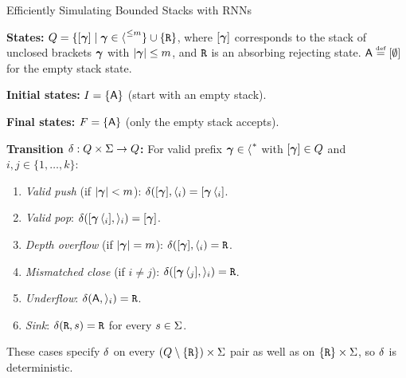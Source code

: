 \begin{question}{Efficiently Simulating Bounded Stacks with RNNs}
\begin{subquestion}
    \textbf{States:} $\states = \{[\stackseq] \mid \stackseq \in \openBr{}^{\le m}\} \cup \{\rejectState\}$, where $[\stackseq]$ corresponds to the stack of unclosed 
    brackets $\stackseq$ with $|\stackseq| \le m$, and $\rejectState$ is an absorbing rejecting state. $\acceptState \defeq [\emptystack]$ for the empty stack state.
    
    \textbf{Initial states:} $\initial = \{\acceptState\}$ (start with an empty stack).
    
    \textbf{Final states:} $\final = \{\acceptState\}$ (only the empty stack accepts).
    
    \textbf{Transition $\trans : \states \times \alphabet \to \states$:} For valid prefix $\stackseq \in \openBr{}^{*}$ with $[\stackseq] \in \states$ and $i, j \in \{1, \dots, k\}$:
    
    \begin{enumerate}
        \item \emph{Valid push} (if $|\stackseq| < m$): $\trans([\stackseq], \openBr{i}) = [\stackseq\, \openBr{i}]$.
        \item \emph{Valid pop}: $\trans([\stackseq\, \openBr{i}], \closeBr{i}) = [\stackseq]$.
        \item \emph{Depth overflow} (if $|\stackseq| = m$): $\trans([\stackseq], \openBr{i}) = \rejectState$.
        \item \emph{Mismatched close} (if $i \ne j$): $\trans([\stackseq\, \openBr{j}], \closeBr{i}) = \rejectState$.
        \item \emph{Underflow}: $\trans(\acceptState, \closeBr{i}) = \rejectState$.
        \item \emph{Sink}: $\trans(\rejectState, s) = \rejectState$ for every $s \in \alphabet$.
    \end{enumerate}
    These cases specify $\trans$ on every $(\states \setminus \{\rejectState\}) \times \alphabet$ pair as well as on $\{\rejectState\} \times \alphabet$, so $\trans$ is deterministic.


\end{subquestion}
\end{question}
